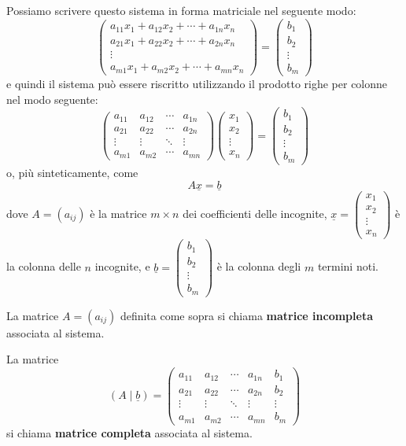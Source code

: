 \documentclass[
  a4paper,
]{article}
\begin{document}
Possiamo scrivere questo sistema in forma matriciale nel seguente modo:
\[
\begin{pmatrix}
a_{11}x_1 + a_{12}x_2 + \cdots + a_{1n}x_n\\
a_{21}x_1 + a_{22}x_2 + \cdots + a_{2n}x_n\\
\vdots\\
a_{m1}x_1 + a_{m2}x_2 + \cdots + a_{mn}x_n
\end{pmatrix}
=
\begin{pmatrix}
b_1\\
b_2\\
\vdots\\
b_m
\end{pmatrix}
\] e quindi il sistema può essere riscritto utilizzando il prodotto
righe per colonne nel modo seguente: \[
\begin{pmatrix}
a_{11} & a_{12} & \cdots & a_{1n}\\
a_{21} & a_{22} & \cdots & a_{2n}\\
\vdots & \vdots & \ddots & \vdots\\
a_{m1} & a_{m2} & \cdots & a_{mn}
\end{pmatrix}
\begin{pmatrix}
x_1\\
x_2\\
\vdots\\
x_n
\end{pmatrix}
=
\begin{pmatrix}
b_1\\
b_2\\
\vdots\\
b_m
\end{pmatrix}
\] o, più sinteticamente, come \[
A\underline{x}=\underline{b}
\] dove \(A=(a_{ij})\) è la matrice \(m\times n\) dei coefficienti delle
incognite,
\(\underline{x}=\begin{pmatrix}x_1\\x_2\\\vdots\\x_n\end{pmatrix}\) è la
colonna delle \(n\) incognite, e
\(\underline{b}=\begin{pmatrix}b_1\\b_2\\\vdots\\b_m\end{pmatrix}\) è la
colonna degli \(m\) termini noti.

\begin{definitionbox}
La matrice \(A=(a_{ij})\) definita come sopra si chiama \textbf{matrice
incompleta} associata al sistema.

La matrice \[
(A\mid \underline{b})=
\left(
\begin{array}{cccc|c}
a_{11} & a_{12} & \cdots & a_{1n} & b_1\\
a_{21} & a_{22} & \cdots & a_{2n} & b_2\\
\vdots & \vdots & \ddots & \vdots & \vdots\\
a_{m1} & a_{m2} & \cdots & a_{mn} & b_m
\end{array}
\right)
\] si chiama \textbf{matrice completa} associata al sistema.
\end{definitionbox}
\end{document}
